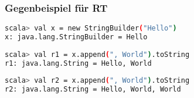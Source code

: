 	\begin{frame}[fragile]
		\frametitle{Gegenbeispiel für RT}
		\begin{lstlisting}[language=bash]
scala> val x = new StringBuilder("Hello")
x: java.lang.StringBuilder = Hello 
		
scala> val r1 = x.append(", World").toString 
r1: java.lang.String = Hello, World 
		
scala> val r2 = x.append(", World").toString 
r2: java.lang.String = Hello, World, World 
\end{lstlisting}	
\end{frame}